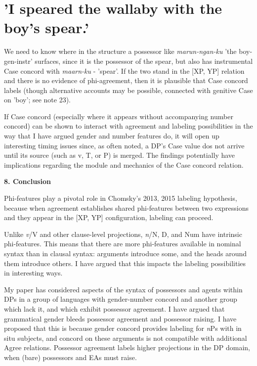 \documentclass[output=paper
,modfonts
,nonflat]{langsci/langscibook}
\begin{document}
\section{  'I speared the wallaby with the boy's spear.'}

We need to know where in the structure a possessor like \textit{marun-ngan-ku} 'the boy-gen-instr' surfaces, since it is the possessor of the spear, but also has instrumental Case concord with \textit{maarn-ku} - 'spear'. If the two stand in the [XP, YP] relation and there is no evidence of phi-agreement, then it is plausible that Case concord labels (though alternative accounts may be possible, connected with genitive Case on 'boy'; see note 23).

If Case concord (especially where it appears without accompanying number concord) can be shown to interact with agreement and labeling possibilities in the way that I have argued gender and number features do, it will open up interesting timing issues since, as often noted, a DP’s Case value dos not arrive until its source (such as v, T, or P) is merged. The findings potentially have implications regarding the module and mechanics of the Case concord relation.  

\textbf{8.  Conclusion}

Phi-features play a pivotal role in Chomsky's 2013, 2015 labeling hypothesis, because when agreement establishes shared phi-features between two expressions and they appear in the [XP, YP] configuration, labeling can proceed. 

Unlike \textit{v}/V and other clause-level projections, \textit{n}/N, D, and Num have intrinsic phi-features. This means that there are more phi-features available in nominal syntax than in clausal syntax: arguments introduce some, and the heads around them introduce others. I have argued that this impacts the labeling possibilities in interesting ways.

My paper has considered aspects of the syntax of possessors and agents within DPs in a group of languages with gender-number concord and another group which lack it, and which exhibit possessor agreement. I have argued that grammatical gender bleeds possessor agreement and possessor raising. I have proposed that this is because gender concord provides labeling for \textit{n}Ps with in situ subjects, and concord on these arguments is not compatible with additional Agree relations. Possessor agreement labels higher projections in the DP domain, when (bare) possessors and EAs must raise.

\sloppy
\printbibliography[heading=subbibliography,notkeyword=this]
\end{document}
